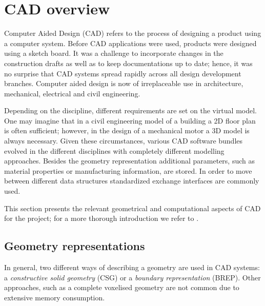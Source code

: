 \section{CAD overview}
\label{sec:CADbackg}
Computer Aided Design (CAD) refers to the process of designing a product using a computer system. Before CAD applications were used, products were designed using a sketch board. It was a challenge to incorporate changes in the construction drafts as well as to keep documentations up to date; hence, it was no surprise that CAD systems spread rapidly across all design development branches. Computer aided design is now of irreplaceable use in architecture, mechanical, electrical and civil engineering.

Depending on the discipline, different requirements are set on the virtual model. One may imagine that in a civil engineering model of a building a 2D floor plan is often sufficient; however, in the design of a mechanical motor a 3D model is always necessary. Given these circumstances, various CAD software bundles evolved in the different disciplines with completely different modelling approaches. Besides the geometry representation additional parameters, such as material properties or manufacturing information, are stored. In order to move between different data structures standardized exchange interfaces are commonly used. 

This section presents the relevant geometrical and computational aspects of CAD for the project; for a more thorough introduction we refer to \cite{sarcarCAD}.

\subsection{Geometry representations}
In general, two different ways of describing a geometry are used in CAD systems: a \emph{constructive solid geometry} (CSG) or a \emph{boundary representation} (BREP). Other approaches, such as a complete voxelised geometry are not common due to extensive memory consumption.
